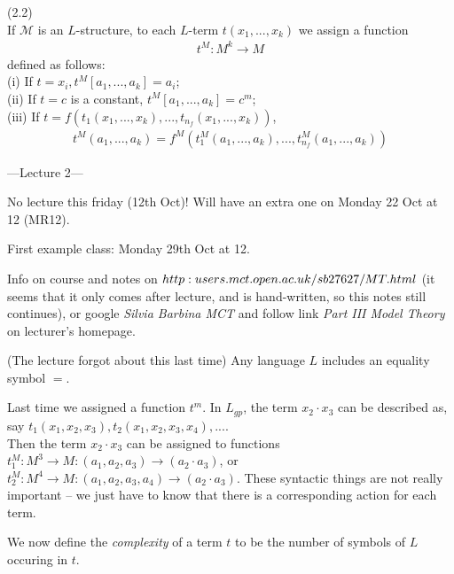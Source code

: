 \documentclass[a4paper]{article}
\begin{document}
\begin{defi} (2.2)\\
If $\mathcal{M}$ is an $L$-structure, to each $L$-term $t(x_1,...,x_k)$ we assign a function
\begin{equation*}
\begin{aligned}
t^M: M^k \to M
\end{aligned}
\end{equation*}
defined as follows:\\
(i) If $t = x_i, t^M [a_1,...,a_k] = a_i$;\\
(ii) If $t=c$ is a constant, $t^M [a_1,...,a_k] = c^m$;\\
(iii) If $t=f(t_1(x_1,...,x_k),...,t_{n_f}(x_1,...,x_k))$, 
\begin{equation*}
\begin{aligned}
t^M (a_1,...,a_k) = f^M(t_1^M(a_1,...,a_k),...,t_{n_f}^M(a_1,...,a_k))
\end{aligned}
\end{equation*}
\end{defi} 

---Lecture 2---

No lecture this friday (12th Oct)! Will have an extra one on Monday 22 Oct at 12 (MR12).

First example class: Monday 29th Oct at 12.

Info on course and notes on $http:\\users.mct.open.ac.uk/sb27627/MT.html$ (it seems that it only comes after lecture, and is hand-written, so this notes still continues), or google \emph{Silvia Barbina MCT} and follow link \emph{Part III Model Theory} on lecturer's homepage.

\begin{rem}
    (The lecture forgot about this last time) Any language $L$ includes an equality symbol $=$.
\end{rem}

Last time we assigned a function $t^m$. In $L_{gp}$, the term $x_2 \cdot x_3$ can be described as, say $t_1(x_1,x_2,x_3),t_2(x_1,x_2,x_3,x_4),...$.\\
Then the term $x_2 \cdot x_3$ can be assigned to functions $t_1^M:M^3\to M:(a_1,a_2,a_3) \to (a_2 \cdot a_3)$, or $t_2^M: M^4 \to M: (a_1,a_2,a_3,a_4) \to (a_2 \cdot a_3)$. These syntactic things are not really important -- we just have to know that there is a corresponding action for each term.

We now define the \emph{complexity} of a term $t$ to be the number of symbols of $L$ occuring in $t$.
\end{document}
